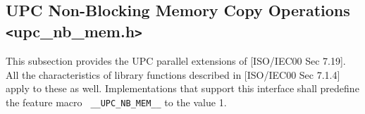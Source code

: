 \subsection{UPC Non-Blocking Memory Copy Operations
            \texttt{<}upc\_nb\_mem.h\texttt{>}}

\npf This subsection provides the UPC parallel extensions of [ISO/IEC00 
    Sec 7.19].  All the characteristics of library functions described
    in [ISO/IEC00 Sec 7.1.4] apply to these as well.  Implementations
    that support this interface shall predefine the feature macro {\tt
    \_\_UPC\_NB\_MEM\_\_} to the value 1.

